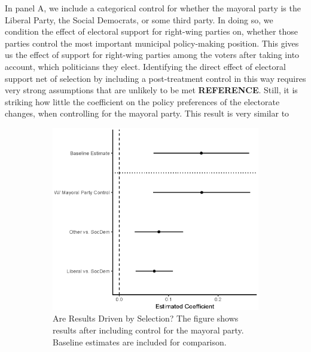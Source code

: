 \documentclass[a4paper,12pt]{article}
\begin{document}
In panel A, we include a categorical control for whether the mayoral party is the Liberal Party, the Social Democrats, or some third party.  In doing so, we condition the effect of electoral support for right-wing parties on, whether those parties control the most important municipal policy-making position. This gives us the effect of support for right-wing parties among the voters after taking into account, which politicians they elect. Identifying the direct effect of electoral support net of selection by including a post-treatment control in this way requires very strong assumptions that are unlikely to be met \textbf{REFERENCE}. Still, it is striking how little the coefficient on the policy preferences of the electorate changes, when controlling for the mayoral party. This result is very similar to 

\begin{figure}
	\begin{subfigure}{0.45\textwidth}
		\includegraphics[width=1\textwidth]{PostTreatControl.eps}
		\caption{Are Results Driven by Selection? The figure shows results after including control for the mayoral party. Baseline estimates are included for comparison.} \label{mech}
	\end{subfigure}  \hfill
	\begin{subfigure}{0.45\textwidth}

\end{subfigure}
\end{figure}
\end{document}
